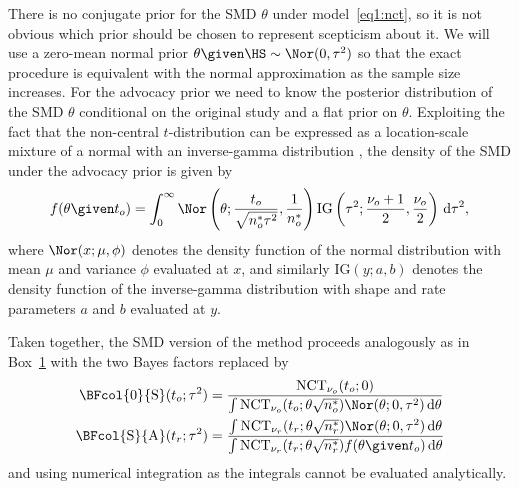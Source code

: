 There is no conjugate prior for the SMD $\theta$ under model~\eqref{eq1:nct}, so
it is not obvious which prior should be chosen to represent scepticism about it.
We will use a zero-mean normal prior $\theta \given \HS \sim \Nor(0, \tau^{2})$
so that the exact procedure is equivalent with the normal approximation as the
sample size increases. For the advocacy prior we need to know the posterior
distribution of the SMD $\theta$ conditional on the original study and a flat
prior on $\theta$. Exploiting the fact that the non-central $t$-distribution can
be expressed as a location-scale mixture of a normal with an inverse-gamma
distribution
\citep[Chapter 31]{Johnson1995}, the density of the SMD under the advocacy prior
is given by
\begin{align*}
  f(\theta \given t_o)
  = \int_0^\infty \Nor\left(\theta; \frac{t_o}{\sqrt{n_o^* \tau^2}},
  \frac{1}{n_o^*}\right)  \text{IG}\left(\tau^2; \frac{\nu_o + 1}{2},
  \frac{\nu_o}{2}\right) \, \text{d}\tau^2,
\end{align*}
where $\Nor(x; \mu, \phi)$ denotes the density function of the normal
distribution with mean $\mu$ and variance $\phi$ evaluated at $x$, and similarly
$\text{IG}(y; a, b)$ denotes the density function of the inverse-gamma
distribution with shape and rate parameters $a$ and $b$ evaluated at $y$.

Taken together, the SMD version of the method proceeds analogously as in
Box~\hyperref[box:nutshell]{1} with the two Bayes factors replaced by
\begin{align*}
  \BFcol{0}{\mathrm{S}}(t_{o};\tau^{2})
  &= \frac{\text{NCT}_{\nu_{o}}(t_{o}; 0)}{\int
  \text{NCT}_{\nu_{o}}(t_{o}; \theta \sqrt{n_{o}^{*}})
  \Nor(\theta; 0, \tau^{2}) \, \text{d}\theta} \\
  \BFcol{\text{S}}{\text{A}}(t_{r};\tau^{2})
  &= \frac{\int\text{NCT}_{\nu_{r}}(t_{r};\theta
  \sqrt{n_{r}^{*}})\Nor(\theta; 0, \tau^{2}) \, \text{d}\theta}{
  \int\text{NCT}_{\nu_{r}}(t_{r};\theta
  \sqrt{n_{r}^{*}}) f(\theta \given t_{o}) \, \text{d} \theta}
\end{align*}
and using numerical integration as the integrals cannot be evaluated
analytically.



